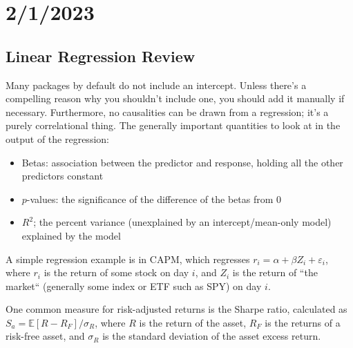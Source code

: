 \chapter{2/1/2023}
\section{Linear Regression Review}
Many packages by default do not include an intercept. Unless there's a compelling reason why you shouldn't include one, you should add it manually if necessary. Furthermore, no causalities can be drawn from a regression; it's a purely correlational thing. The generally important quantities to look at in the output of the regression: \begin{itemize}
	\item Betas: association between the predictor and response, holding all the other predictors constant
	\item $p$-values: the significance of the difference of the betas from 0
	\item $R^2$; the percent variance (unexplained by an intercept/mean-only model) explained by the model
\end{itemize} A simple regression example is in CAPM, which regresses $r_i=\alpha+\beta Z_i+\varepsilon_i$, where $r_i$ is the return of some stock on day $i$, and $Z_i$ is the return of ``the market`` (generally some index or ETF such as SPY) on day $i$.

One common measure for risk-adjusted returns is the Sharpe ratio, calculated as $S_a=\mathbb E[R-R_F]/\sigma_R$, where $R$ is the return of the asset, $R_F$ is the returns of a risk-free asset, and $\sigma_R$ is the standard deviation of the asset excess return.

